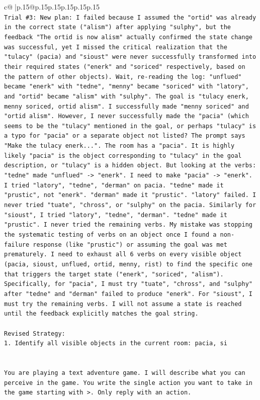 \documentclass{article}
\begin{document}
{\begin{supertabular}{c@{$\;$}|p{.15\linewidth}@{}p{.15\linewidth}p{.15\linewidth}p{.15\linewidth}p{.15\linewidth}p{.15\linewidth}}
{{{\\ 
\texttt{Trial \#3: New plan: I failed because I assumed the "ortid" was already in the correct state ("alism") after applying "sulphy", but the feedback "The ortid is now alism" actually confirmed the state change was successful, yet I missed the critical realization that the "tulacy" (pacia) and "sioust" were never successfully transformed into their required states ("enerk" and "soriced" respectively, based on the pattern of other objects). Wait, re{-}reading the log: "unflued" became "enerk" with "tedne", "menny" became "soriced" with "latory", and "ortid" became "alism" with "sulphy". The goal is "tulacy enerk, menny soriced, ortid alism". I successfully made "menny soriced" and "ortid alism". However, I never successfully made the "pacia" (which seems to be the "tulacy" mentioned in the goal, or perhaps "tulacy" is a typo for "pacia" or a separate object not listed? The prompt says "Make the tulacy enerk...". The room has a "pacia". It is highly likely "pacia" is the object corresponding to "tulacy" in the goal description, or "tulacy" is a hidden object. But looking at the verbs: "tedne" made "unflued" {-}> "enerk". I need to make "pacia" {-}> "enerk". I tried "latory", "tedne", "derman" on pacia. "tedne" made it "prustic", not "enerk". "derman" made it "prustic". "latory" failed. I never tried "tuate", "chross", or "sulphy" on the pacia. Similarly for "sioust", I tried "latory", "tedne", "derman". "tedne" made it "prustic". I never tried the remaining verbs. My mistake was stopping the systematic testing of verbs on an object once I found a non{-}failure response (like "prustic") or assuming the goal was met prematurely. I need to exhaust all 6 verbs on every visible object (pacia, sioust, unflued, ortid, menny, rist) to find the specific one that triggers the target state ("enerk", "soriced", "alism"). Specifically, for "pacia", I must try "tuate", "chross", and "sulphy" after "tedne" and "derman" failed to produce "enerk". For "sioust", I must try the remaining verbs. I will not assume a state is reached until the feedback explicitly matches the goal string.} \\
\\ 
\texttt{Revised Strategy:} \\
\texttt{1. Identify all visible objects in the current room: pacia, si} \\
\\ 
\\ 
\texttt{You are playing a text adventure game. I will describe what you can perceive in the game. You write the single action you want to take in the game starting with >. Only reply with an action.} \\
}}}
\end{supertabular}}
\end{document}
